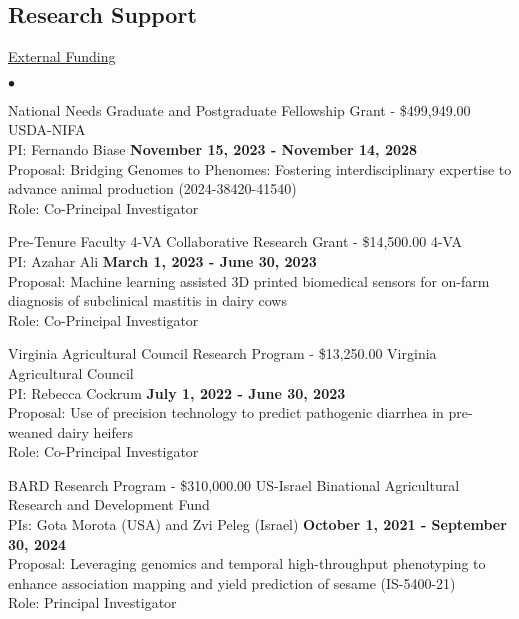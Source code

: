 \documentclass[margin,line,10pt]{res}
\newenvironment{list2}{
  \begin{list}{$\bullet$}{%
      \setlength{\itemsep}{0in}
      \setlength{\parsep}{0in} \setlength{\parskip}{0in}
      \setlength{\topsep}{0in} \setlength{\partopsep}{0in} 
      \setlength{\leftmargin}{0.2in}}}{\end{list}}
\begin{document}
\begin{resume}
\vspace{0.5cm}
\section{\sc Research Support}
\begin{flushleft}
\hspace{0.2cm} \underline{External Funding}
\end{flushleft}

\begin{list2}

  \item National Needs Graduate and Postgraduate Fellowship Grant  - \$499,949.00  \hfill USDA-NIFA \\
  PI: Fernando Biase  \hfill \textbf{November 15, 2023 - November 14, 2028}\\
Proposal: Bridging Genomes to Phenomes: Fostering interdisciplinary expertise to advance animal production (2024-38420-41540)\\
Role: Co-Principal Investigator \\

\vspace{0.5cm}

  \item Pre-Tenure Faculty 4-VA Collaborative Research Grant - \$14,500.00  \hfill 4-VA \\
  PI: Azahar Ali  \hfill \textbf{March 1, 2023 - June 30, 2023}\\
Proposal: Machine learning assisted 3D printed biomedical sensors for on-farm diagnosis of subclinical mastitis in dairy cows  \\
Role: Co-Principal Investigator \\

\vspace{0.5cm}


  \item Virginia Agricultural Council Research Program - \$13,250.00  \hfill Virginia Agricultural Council \\
  PI: Rebecca Cockrum  \hfill \textbf{July 1, 2022 - June 30, 2023}\\
Proposal: Use of precision technology to predict pathogenic diarrhea in pre-weaned dairy heifers  \\
Role: Co-Principal Investigator \\

\vspace{0.5cm}


\item BARD Research Program - \$310,000.00  \hfill US-Israel Binational Agricultural Research and Development Fund  \\
  PIs: Gota Morota (USA) and Zvi Peleg (Israel)   \hfill \textbf{October 1, 2021 -  September 30, 2024}\\
Proposal: Leveraging genomics and temporal high-throughput phenotyping to enhance association mapping and yield prediction of sesame (IS-5400-21) \\
Role: Principal Investigator \\



\end{list2}
\end{resume}
\end{document}
